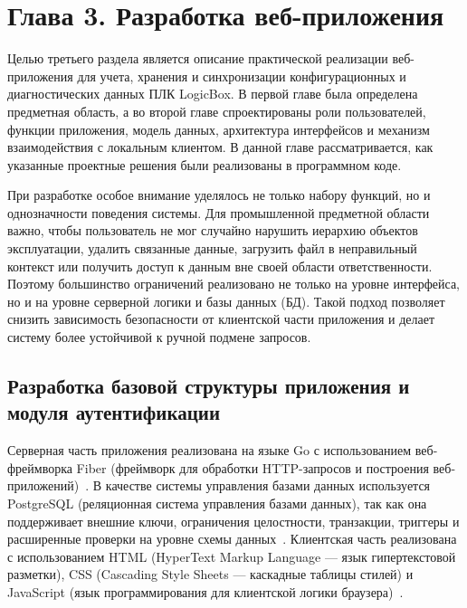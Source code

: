 \section*{Глава 3. Разработка веб-приложения}
\label{sec:chapter3}

\providecommand{\tabref}[1]{\hyperref[#1]{таблице~\ref*{#1}}}
\providecommand{\figref}[1]{\hyperref[#1]{рисунке~\ref*{#1}}}
\providecommand{\appref}[1]{\hyperref[#1]{приложении~\ref*{#1}}}

Целью третьего раздела является описание практической реализации веб-приложения для учета, хранения и синхронизации конфигурационных и диагностических данных ПЛК LogicBox. В первой главе была определена предметная область, а во второй главе спроектированы роли пользователей, функции приложения, модель данных, архитектура интерфейсов и механизм взаимодействия с локальным клиентом. В данной главе рассматривается, как указанные проектные решения были реализованы в программном коде.

При разработке особое внимание уделялось не только набору функций, но и однозначности поведения системы. Для промышленной предметной области важно, чтобы пользователь не мог случайно нарушить иерархию объектов эксплуатации, удалить связанные данные, загрузить файл в неправильный контекст или получить доступ к данным вне своей области ответственности. Поэтому большинство ограничений реализовано не только на уровне интерфейса, но и на уровне серверной логики и базы данных (БД). Такой подход позволяет снизить зависимость безопасности от клиентской части приложения и делает систему более устойчивой к ручной подмене запросов.


\subsection{Разработка базовой структуры приложения и модуля аутентификации}

Серверная часть приложения реализована на языке Go с использованием веб-фреймворка Fiber (фреймворк для обработки HTTP-запросов и построения веб-приложений)~\cite{golang_official,fiber_official}. В качестве системы управления базами данных используется PostgreSQL (реляционная система управления базами данных), так как она поддерживает внешние ключи, ограничения целостности, транзакции, триггеры и расширенные проверки на уровне схемы данных~\cite{postgresql_official}. Клиентская часть реализована с использованием HTML (HyperText Markup Language --- язык гипертекстовой разметки), CSS (Cascading Style Sheets --- каскадные таблицы стилей) и JavaScript (язык программирования для клиентской логики браузера)~\cite{mdn_html,mdn_css,mdn_js}.

